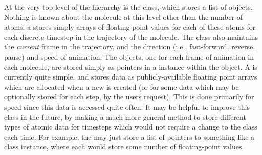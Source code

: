 \begin{centering}
\end{centering}

At the very top level of the  hierarchy is the  class, which stores a list of  objects.  Nothing is known about the molecule at this level other than the number of atoms; a  stores simply arrays of floating-point values for each of these atoms for each discrete timestep in the trajectory of the molecule.  The  class also maintains the {\em current} frame in the trajectory, and the direction (i.e., fast-forward, reverse, pause) and speed of animation.  The  objects, one for each frame of animation in each molecule, are stored simply as pointers in a  instance within the  object.  A  is currently quite simple, and stores data as publicly-available floating point arrays which are allocated when a new  is created (or for some data which may be optionally stored for each step, by the users request).  This is done primarily for speed since this data is accessed quite often.  It may be helpful to improve this class in the future, by making a much more general method to store different types of atomic data for timesteps which would not require a change to the  class each time.  For example, the  may just store a list of pointers to something like a  class instance, where each  would store some number of floating-point values.

